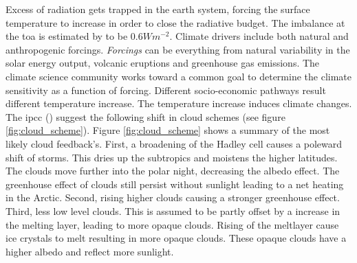 Excess of radiation gets trapped in the earth system, forcing the surface temperature to increase in order to close the radiative budget. The imbalance at the \acrfull{toa} is estimated by \cite{Wild2019TheModels} to be $0.6W m^{-2}$. 
Climate drivers include both natural and anthropogenic forcings. \textit{Forcings} can be everything from natural variability in the solar energy output, volcanic eruptions and greenhouse gas emissions. The climate science community works toward a common goal to determine the climate sensitivity as a function of forcing. Different socio-economic pathways result different temperature increase. The temperature increase induces climate changes. The \acrfull{ipcc} (\cite{IPCC_CH7_clouds}) suggest the following shift in cloud schemes (see figure \ref{fig:cloud_scheme}). Figure \ref{fig:cloud_scheme} shows a summary of the most likely cloud feedback's. First, a broadening of the Hadley cell causes a poleward shift of storms. This dries up the subtropics and moistens the higher latitudes. The clouds move further into the polar night, decreasing the albedo effect. The greenhouse effect of clouds still persist without sunlight leading to a net heating in the Arctic. Second, rising higher clouds causing a stronger greenhouse effect. Third, less low level clouds. This is assumed to be partly offset by a increase in the melting layer, leading to more opaque clouds. Rising of the meltlayer cause ice crystals to melt resulting in more opaque clouds. These opaque clouds have a higher albedo and reflect more sunlight. 